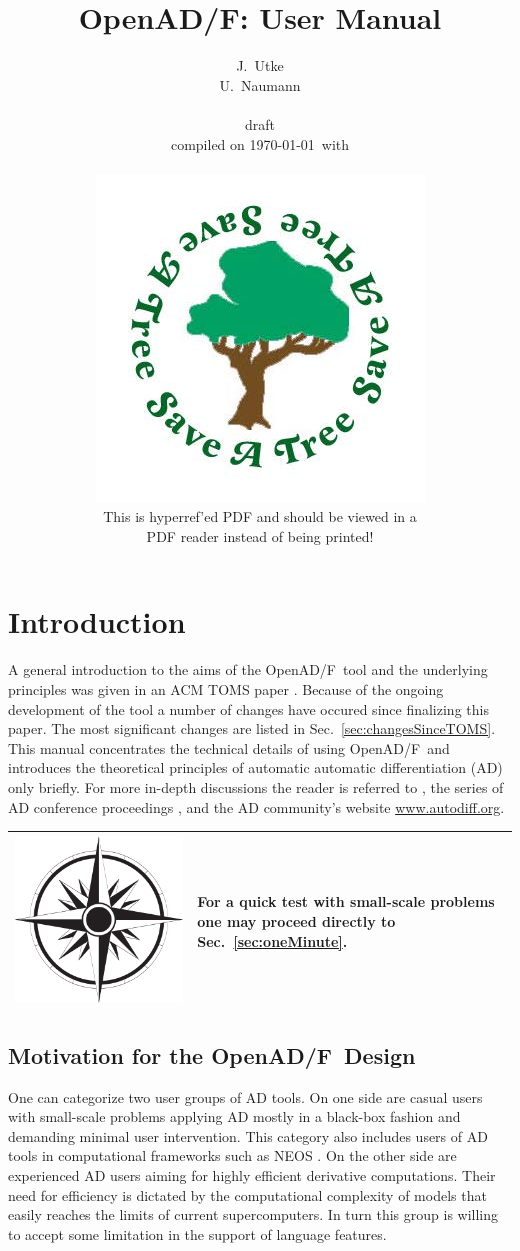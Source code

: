 \documentclass{book}
\title{OpenAD/F: User Manual}
\author{J.~Utke  \\
	U.~Naumann \\\\
\scriptsize draft  \\
\scriptsize compiled on \today\ with \\
\framebox{
\begin{minipage}{6.5cm}
\tiny

\end{minipage}
}
\vspace{4cm}
\\
\includegraphics[width=.2\textwidth]{savetree.jpg}\\[1ex]
\Large This is hyperref'ed PDF and should be viewed in a \\[.5ex]
\Large PDF reader instead of being printed!
}
\date{ }
\newcommand{\OpenADF}{OpenAD/F}
\newcommand{\refsec}[1]{{Sec.~\ref{#1}}}
\newcommand{\nav}[1]{
\begin{tabular}{|m{.03\textwidth}|m{.9\textwidth}|}\hline
\vspace{1mm}
\includegraphics[width=.03\textwidth]{windrose_zh1}&
\vspace{1mm}
\begin{minipage}[c]{.86\textwidth}
\small {#1}
\end{minipage}
\vspace{1mm}
\\\hline
\end{tabular}
}
\begin{document}
\maketitle
\tableofcontents
\listoffigures
\listoftables

\pagestyle{fancy}
\lstset{basicstyle=\small\tt, 
	numbers=left, 
	numberstyle=\scriptsize,
  	stepnumber=1, 
	numbersep=10pt, 
	breaklines=true,
	resetmargins=false,
	xleftmargin=6ex,
	columns=fullflexible}
\chapter{Introduction} \label{sec:Introduction}

A general introduction to the aims of the \OpenADF\ tool and the underlying principles 
was given in an ACM TOMS paper \cite{Utke2008OAM}. 
Because of the ongoing development of the tool a number of changes have occured 
since finalizing this paper. The most significant changes are listed in \refsec{sec:changesSinceTOMS}.
This manual concentrates the technical details of using \OpenADF\ and introduces the 
theoretical principles of automatic automatic differentiation (AD) only 
briefly. For more in-depth discussions the reader is referred to 
\cite{Griewank2008EDP}, the series of AD conference proceedings 
\cite{Griewank1991ADo,Berz1996CDT,Corliss2002ADo,Bucker2005ADA,Bischof2008AiA},
and the AD community's website \url{www.autodiff.org}. \\
\nav{For a quick test with small-scale problems one may proceed directly to \refsec{sec:oneMinute}.} 

\section{Motivation for the \OpenADF\ Design}


One can categorize two user groups of AD tools. 
On one side are casual users 
with small-scale problems applying AD mostly in a black-box fashion 
and demanding minimal user intervention. 
This category also includes users of AD tools in  computational 
frameworks such as NEOS \cite{neosWeb}.
On the other side are experienced AD users aiming for highly efficient 
derivative computations.
Their need for efficiency is dictated by the 
computational complexity of models that easily reaches the limits of  current 
supercomputers. 
In turn this group is willing to accept some limitation in the support of 
language features.
\end{document}
